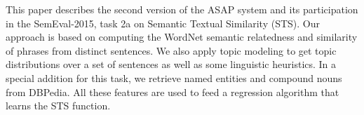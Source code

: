 This paper describes the second version of the ASAP system and its participation in the SemEval-2015, task 2a on Semantic Textual Similarity (STS). Our approach is based on computing the WordNet semantic relatedness and similarity of phrases from distinct sentences. We also apply topic modeling to get topic distributions over a set of sentences as well as some linguistic heuristics. In a special addition for this task, we retrieve named entities and compound nouns from DBPedia. All these features are used to feed a regression algorithm that learns the STS function.
